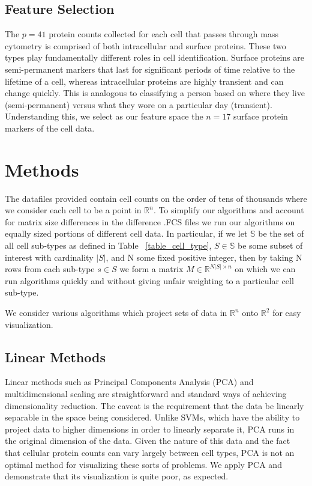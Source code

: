 \documentclass{article}
\begin{document}
\subsection{Feature Selection}
The $p=41$ protein counts collected for each cell that passes through mass cytometry is comprised of both intracellular and surface proteins. These two types play fundamentally different roles in cell identification. Surface proteins are semi-permanent markers that last for significant periods of time relative to the lifetime of a cell, whereas intracellular proteins are highly transient and can change quickly. This is analogous to classifying a person based on where they live (semi-permanent) versus what they wore on a particular day (transient). Understanding this, we select as our feature space the $n=17$ surface protein markers of the cell data.

\section{Methods}
\label{methods}

The datafiles provided contain cell counts on the order of tens of thousands where we consider each cell to be a point in $\mathbb{R}^n$. To simplify our algorithms and account for matrix size differences in the difference .FCS files we run our algorithms on equally sized portions of different cell data. In particular, if we let $\mathbb{S}$ be the set of all cell sub-types as defined in Table ~\ref{table_cell_type}, $S \in \mathbb{S}$  be some subset of interest with cardinality $|S|$, and N some fixed positive integer, then by taking N rows from each sub-type $s \in S$ we form a matrix $M \in \mathbb{R}^{N |S| \times n}$ on which we can run algorithms quickly and without giving unfair weighting to a particular cell sub-type.

We consider various algorithms which project sets of data in $\mathbb{R}^n$ onto $\mathbb{R}^2$ for easy visualization.

\subsection{Linear Methods}
Linear methods such as Principal Components Analysis (PCA) and multidimensional scaling are straightforward and standard ways of achieving dimensionality reduction. The caveat is the requirement that the data be linearly separable in the space being considered. Unlike SVMs, which have the ability to project data to higher dimensions in order to linearly separate it, PCA runs in the original dimension of the data. Given the nature of this data and the fact that cellular protein counts can vary largely between cell types, PCA is not an optimal method for visualizing these sorts of problems. We apply PCA and demonstrate that its visualization is quite poor, as expected.
\end{document}
